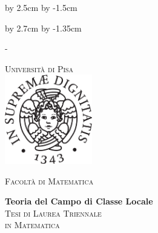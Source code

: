 \advance\vsize by 2.5cm %
\advance\voffset by -1.5cm %


\begin{titlingpage}


\advance\hsize by 2.7cm %
\advance\hoffset by -1.35cm %




\calccentering{\unitlength}
\begin{adjustwidth*}{\unitlength}{-\unitlength}


\thispagestyle{empty}
\begin{center}
\large
\textsc{\Large Università di Pisa\\}
\vspace{0.6cm}
\includegraphics[width=3.8cm]{cherubino.pdf}

\vspace{0.8cm}
\textsc{\Large{Facoltà di Matematica}}\\



\vspace{2.5cm}


{\Huge\textbf{Teoria del Campo di Classe Locale}}
\\[2.0cm]

\textsc{Tesi di Laurea Triennale \\[0.2cm] in Matematica}\\
\vspace{0.5cm}

\begin{center}

\end{center}

\vspace{0.2cm}

%
%


\end{center}
\end{adjustwidth*}
\end{titlingpage}
